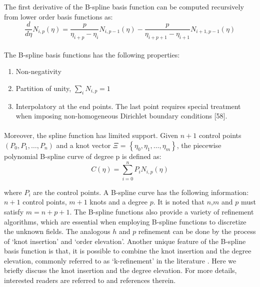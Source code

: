 The first derivative of the B-spline basis function can be computed recursively from lower order basis functions as:
\begin{equation}
    \frac{d}{d\eta} N_{i,p}(\eta) =
        \frac{p}{\eta_{i+p} - \eta_i} N_{i,p-1}(\eta) -
        \frac{p}{\eta_{i+p+1} - \eta_{i+1}} N_{i+1,p-1}(\eta)
\end{equation}

\paragraph{}
The B-spline basis functions has the following properties:
\begin{enumerate}
    \item Non-negativity
    \item Partition of unity, $\sum_i N_{i,p}=1$
    \item Interpolatory at the end points. The last point requires special treatment when imposing non-homogeneous Dirichlet boundary conditions [58].
\end{enumerate}


\paragraph{}
Moreover, the spline function has limited support.
Given $n + 1$ control points $(P_0 ,P_1,\dots,P_n )$ and a knot vector 
    $\Xi$ = $\left\{
        \eta_0 ,\eta_1 ,\dots,\eta_m 
    \right\}$, the piecewise polynomial B-spline curve of degree p is defined as:
\begin{equation}
    C(\eta) = \sum_{i=0}^n P_i N_{i,p} (\eta)
\end{equation}

where $P_i$ are the control points.
A B-spline curve has the following information: $n+1$ control points, $m+1$ knots and a degree $p$.
It is noted that $n$,$m$ and $p$ must satisfy $m = n + p + 1$.
The B-spline functions also provide a variety of refinement algorithms, which are essential when employing B-spline functions to discretize the unknown fields.
The analogous $h$ and $p$ refinement can be done by the process of `knot insertion' and `order elevation'.
Another unique feature of the B-spline basis function is that, it is possible to combine the knot insertion and the degree elevation, commonly referred to as ‘k-refinement’ in the literature \cite{Hug2005b}.
Here we briefly discuss the knot insertion and the degree elevation.
For more details, interested readers are referred to \cite{Pie1997,Hug2005b} and references therein.


